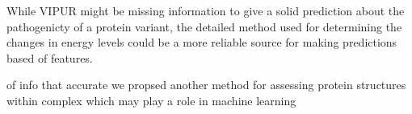 While VIPUR might be missing information to give a solid prediction about the pathogenicty of a protein variant, the detailed method used for determining the changes in energy levels could be a more reliable source for making predictions based of features.

 of info that accurate we propsed another method for assessing protein structures within complex which may play a role in machine learning